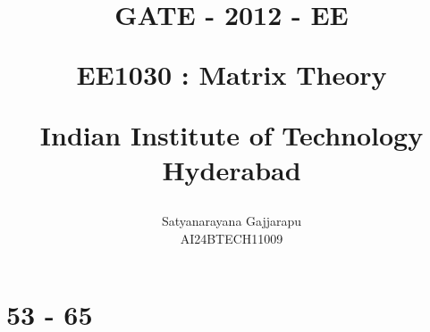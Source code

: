 \documentclass[journal]{IEEEtran}
\begin{document}

\vspace{3cm}




\title{
GATE - 2012 - EE

\large{EE1030 : Matrix Theory}

Indian Institute of Technology Hyderabad
}
\author{Satyanarayana Gajjarapu

AI24BTECH11009
}	





\maketitle




\bigskip

\renewcommand{\thefigure}{\theenumi}
\renewcommand{\thetable}{\theenumi}


\section{53 - 65}
\end{document}
